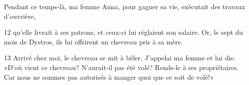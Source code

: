 Pendant ce temps-là, ma femme Anna, pour gagner sa vie, exécutait des travaux d’ouvrière,

12 qu’elle livrait à ses patrons, et ceux-ci lui réglaient son salaire. Or, le sept du mois de Dystros, ils lui offrirent un chevreau pris à sa mère.

13 Arrivé chez moi, le chevreau se mit à bêler. J’appelai ma femme et lui dis: «D’où vient ce chevreau? N’aurait-il pas été volé? Rends-le à ses propriétaires. Car nous ne sommes pas autorisés à manger quoi que ce soit de volé!»